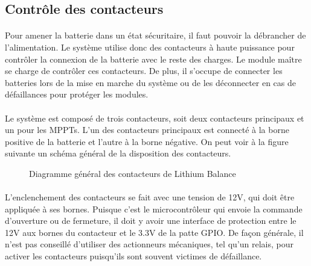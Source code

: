 
\subsection{Contrôle des contacteurs}

	\paragraph*{}
	Pour amener la batterie dans un état sécuritaire, il faut pouvoir la débrancher de l'alimentation. Le système utilise donc des contacteurs à haute puissance pour contrôler la connexion de la batterie avec le reste des charges. Le module maître se charge de contrôler ces contacteurs. De plus, il s'occupe de connecter les batteries lors de la mise en marche du système ou de les déconnecter en cas de défaillances pour protéger les modules.

	\paragraph*{}
	Le système est composé de trois contacteurs, soit deux contacteurs principaux et un pour les MPPTs. L'un des contacteurs principaux est connecté à la borne positive de la batterie et l'autre à la borne négative. On peut voir à la figure suivante un schéma général de la disposition des contacteurs.

	\begin{figure}[H]
		\centering
		\caption{Diagramme général des contacteurs de Lithium Balance \cite{Lithium_Balance}}
		\label{fig:lithiumbalancecontactordiagram}
	\end{figure}

	\paragraph*{}
	L'enclenchement des contacteurs se fait avec une tension de 12V, qui doit être appliquée à ses bornes. Puisque c'est le microcontrôleur qui envoie la commande d'ouverture ou de fermeture, il doit y avoir une interface de protection entre le 12V aux bornes du contacteur et le 3.3V de la patte GPIO. De façon générale, il n'est pas conseillé d'utiliser des actionneurs mécaniques, tel qu'un relais, pour activer les contacteurs puisqu'ils sont souvent victimes de défaillance.

